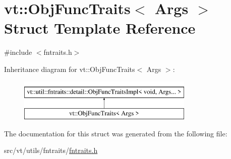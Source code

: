 \hypertarget{structvt_1_1_obj_func_traits}{}\section{vt\+:\+:Obj\+Func\+Traits$<$ Args $>$ Struct Template Reference}
\label{structvt_1_1_obj_func_traits}


{\ttfamily \#include $<$fntraits.\+h$>$}

Inheritance diagram for vt\+:\+:Obj\+Func\+Traits$<$ Args $>$\+:\begin{figure}[H]
\begin{center}
\leavevmode
\includegraphics[height=2.000000cm]{structvt_1_1_obj_func_traits}
\end{center}
\end{figure}


The documentation for this struct was generated from the following file\+:\begin{DoxyCompactItemize}
\item 
src/vt/utils/fntraits/\hyperlink{fntraits_8h}{fntraits.\+h}\end{DoxyCompactItemize}
